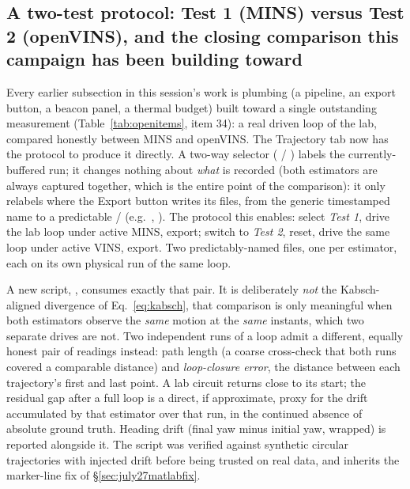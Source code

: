 \subsection{A two-test protocol: Test 1 (MINS) versus Test 2 (openVINS), and
the closing comparison this campaign has been building toward}
\label{sec:july27twotest}
Every earlier subsection in this session's work is plumbing (a pipeline,
an export button, a beacon panel, a thermal budget) built toward a single
outstanding measurement (Table~\ref{tab:openitems}, item 34): a real driven
loop of the lab, compared honestly between MINS and openVINS. The Trajectory
tab now has the protocol to produce it directly. A two-way selector
( / ) labels the currently-buffered run; it changes
nothing about \emph{what} is recorded (both estimators are always captured
together, which is the entire point of the comparison): it only relabels
where the Export button writes its files, from the generic timestamped name
to a predictable  / 
(e.g.\ , ). The protocol this
enables: select \emph{Test 1}, drive the lab loop under active MINS,
export; switch to \emph{Test 2}, reset, drive the same loop under active
VINS, export. Two predictably-named files, one per estimator, each on its
own physical run of the same loop.

A new script, , consumes exactly that pair. It
is deliberately \emph{not} the Kabsch-aligned divergence of
Eq.~\ref{eq:kabsch}, that comparison is only meaningful when both
estimators observe the \emph{same} motion at the \emph{same} instants, which
two separate drives are not. Two independent runs of a loop admit a
different, equally honest pair of readings instead: path length (a
coarse cross-check that both runs covered a comparable distance) and
\emph{loop-closure error}, the distance between each trajectory's first
and last point. A lab circuit returns close to its start; the residual gap
after a full loop is a direct, if approximate, proxy for the drift
accumulated by that estimator over that run, in the continued absence of
absolute ground truth. Heading drift (final yaw minus initial yaw, wrapped)
is reported alongside it. The script was verified against synthetic
circular trajectories with injected drift before being trusted on real data,
and inherits the marker-line fix of \S\ref{sec:july27matlabfix}.

